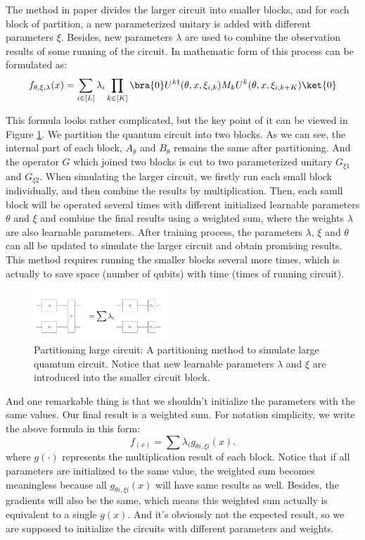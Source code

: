 \documentclass[sigconf]{acmart}
\begin{document}
The method in paper \cite{marshall2022high} divides the larger circuit into smaller blocks, and for each block of partition, a new parameterized unitary is added with different parameters $\xi$. Besides, new parameters $\lambda$ are used to combine the observation results of some running of the circuit. In mathematic form of this process can be formulated as:
$$f_{\theta,\xi,\lambda}(x)=\sum_{i\in [L]}\lambda_i\prod_{k\in [K]}\bra{0}U^{k\dagger}(\theta,x,\xi_{i,k})M_kU^k(\theta,x,\xi_{i,k+K})\ket{0}$$

This formula looks rather complicated, but the key point of it can be viewed in Figure \ref{fig:part}. We partition the quantum circuit into two blocks. As we can see, the internal part of each block, $A_{\theta}$ and $B_{\theta}$ remains the same after partitioning. And the operator $G$ which joined two blocks is cut to two parameterized unitary $G_{\xi 1}$ and $G_{\xi 2}$. When simulating the larger circuit, we firstly run each small block individually, and then combine the results by multiplication. Then, each samll block will be operated several times with different initialized learnable parameters $\theta$ and $\xi$ and combine the final results using a weighted sum, where the weights $\lambda$ are also learnable parameters. After training process, the parameters $\lambda$, $\xi$ and $\theta$ can all be updated to simulate the larger circuit and obtain promising results. This method requires running the smaller blocks several more times, which is actually to save space (number of qubits) with time (times of running circuit).

\begin{figure}[!ht]
	\centering
	\includegraphics[width=0.45\textwidth]{part.png}
	\caption{Partitioning large circuit: {\small \textnormal{A partitioning method to simulate large quamtum circuit. Notice that new learnable parameters $\lambda$ and $\xi$ are introduced into the smaller circuit block.}} }
	\label{fig:part}
\end{figure}

And one remarkable thing is that we shouldn't initialize the parameters with the same values. Our final result is a weighted sum. For notation simplicity, we write the above formula in this form:
$$f_(x)=\sum \lambda_i g_{\theta i, \xi i}(x).$$
where $g(\cdot)$ represents the multiplication result of each block. Notice that if all parameters are initialized to the same value, the weighted sum becomes meaningless because all $g_{\theta i, \xi i}(x)$ will have same results as well. Besides, the gradients will also be the same, which means this weighted sum actually is equivalent to a single $g(x)$. And it's obviously not the expected result, so we are supposed to initialize the circuits with different parameters and weights.
\end{document}
